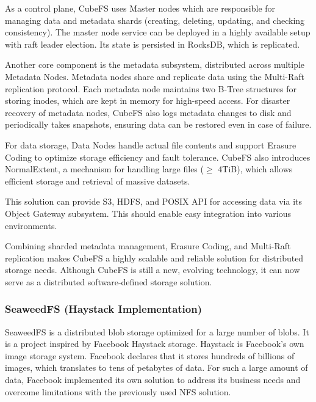 As a control plane, CubeFS uses Master nodes which are responsible for managing data and metadata shards (creating, deleting, updating, and checking consistency). The master node service can be deployed in a highly available setup with raft leader election. Its state is persisted in RocksDB, which is replicated.

Another core component is the metadata subsystem, distributed across multiple Metadata Nodes. Metadata nodes share and replicate data using the Multi-Raft replication protocol. Each metadata node maintains two B-Tree structures for storing inodes, which are kept in memory for high-speed access. For disaster recovery of metadata nodes, CubeFS also logs metadata changes to disk and periodically takes snapshots, ensuring data can be restored even in case of failure.

For data storage, Data Nodes handle actual file contents and support Erasure Coding to optimize storage efficiency and fault tolerance. CubeFS also introduces NormalExtent, a mechanism for handling large files ($\geq$ 4TiB), which allows efficient storage and retrieval of massive datasets. \cite{cubefs_authors_cubefs_nodate}

This solution can provide S3, HDFS, and POSIX API for accessing data via its Object Gateway subsystem. This should enable easy integration into various environments.

Combining sharded metadata management, Erasure Coding, and Multi-Raft replication makes CubeFS a highly scalable and reliable solution for distributed storage needs. Although CubeFS is still a new, evolving technology, it can now serve as a distributed software-defined storage solution.  \cite{cubefs_authors_cubefs_nodate}


\subsubsection{SeaweedFS (Haystack Implementation)}\label{sec:seaweedfs_haystack}
SeaweedFS is a distributed blob storage optimized for a large number of blobs. It is a project inspired by Facebook Haystack storage. Haystack is Facebook's own image storage system. Facebook declares that it stores hundreds of billions of images, which translates to tens of petabytes of data. For such a large amount of data, Facebook implemented its own solution to address its business needs and overcome limitations with the previously used NFS solution. \cite{seaweedfs_seaweedfs_2024, beaver_finding_2010}

